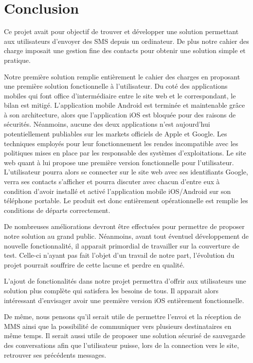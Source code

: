 \cleardoublepage



\chapter*{Conclusion}



Ce projet avait pour objectif de trouver et développer une solution permettant aux utilisateurs d'envoyer des SMS depuis un ordinateur.
De plus notre cahier des charge imposait une gestion fine des contacts pour obtenir une solution simple et pratique.

Notre première solution remplie entièrement le cahier des charges en proposant une première solution fonctionnelle à l'utilisateur. 
Du coté des applications mobiles qui font office d'intermédiaire entre le site web et le correspondant, le bilan est mitigé. L'application mobile Android est terminée et maintenable grâce à son architecture, alors que l'application iOS est bloquée pour des raisons de sécurités.
Néanmoins, aucune des deux applications n'est aujourd'hui potentiellement publiables sur les markets officiels de Apple et Google. Les techniques employés pour leur fonctionnement les rendes incompatible avec les politiques mises en place par les responsable des systèmes d'exploitations.
Le site web quant à lui propose une première version fonctionnelle pour l'utilisateur. L'utilisateur pourra alors se connecter sur le site web avec
ses identifiants Google, verra ses contacts s'afficher et pourra discuter avec chacun d'entre eux à condition d'avoir installé et activé l'application
mobile iOS/Android sur son téléphone portable.
Le produit est donc entièrement opérationnelle est remplie les conditions de départs correctement.

De nombreuses améliorations devront être effectuées pour permettre de proposer notre solution au grand public.
Néanmoins, avant tout éventuel développement de nouvelle fonctionnalité, il apparait primordial de travailler sur la couverture de test. Celle-ci 
n'ayant pas fait l'objet d'un travail de notre part, l'évolution du projet pourrait souffrire de cette lacune et perdre en qualité.

L'ajout de fonctionalités dans notre projet permettra d'offrir aux utilisateurs une solution plus complète qui satisfera les besoins de tous.
Il apparait alors intéressant d'envisager avoir une première version iOS entièrement fonctionnelle.

De même, nous pensons qu'il serait utile de permettre l'envoi et la réception de MMS ainsi que la possibilité de communiquer vers plusieurs destinataires
en même temps. Il serait aussi utile de proposer une solution sécurisé de sauvegarde des conversations afin que l'utilisateur puisse, lors de la connection vers le site, retrouver ses précédents messages. 
